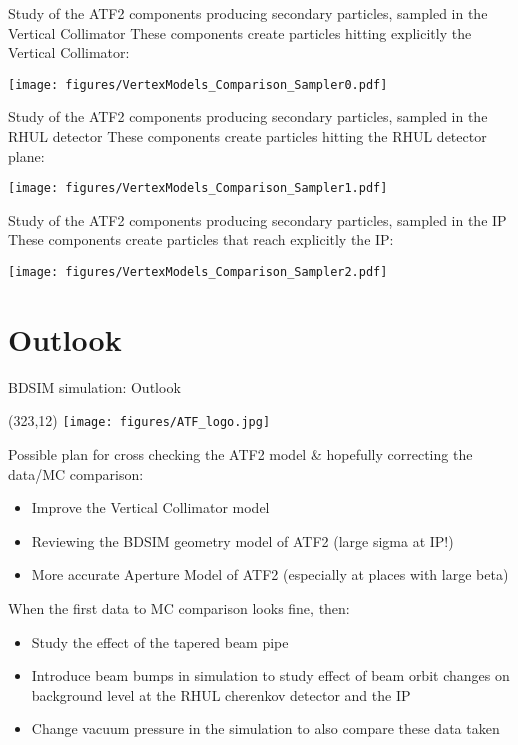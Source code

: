 \documentclass[xcolor={dvipsnames}]{beamer}
\newcommand{\ATFlogo}{
  \setlength{\TPHorizModule}{1pt}
  \setlength{\TPVertModule}{1pt}
  \begin{textblock}{1}(323,12)
   \texttt{[image: figures/ATF\_logo.jpg]}
  \end{textblock}
}
\begin{document}
\begin{frame}{Study of the ATF2 components producing secondary particles, sampled in the Vertical Collimator}
These components create particles hitting explicitly the Vertical Collimator:
 \begin{center}
\texttt{[image: figures/VertexModels\_Comparison\_Sampler0.pdf]}
\end{center}
\end{frame}
\begin{frame}{Study of the ATF2 components producing secondary particles, sampled in the RHUL detector}
These components create particles hitting the RHUL detector plane:
 \begin{center}
\texttt{[image: figures/VertexModels\_Comparison\_Sampler1.pdf]}
\end{center}
\end{frame}
\begin{frame}{Study of the ATF2 components producing secondary particles, sampled in the IP}
These components create particles that reach explicitly the IP:
 \begin{center}
\texttt{[image: figures/VertexModels\_Comparison\_Sampler2.pdf]}
\end{center}
\end{frame}

\section{Outlook}
\begin{frame}{BDSIM simulation: Outlook}
\ATFlogo
Possible plan for cross checking the ATF2 model \& hopefully correcting the data/MC comparison:\\
\begin{itemize}
 \item Improve the Vertical Collimator model
 \item Reviewing the BDSIM geometry model of ATF2 (large sigma at IP!)
 \item More accurate Aperture Model of ATF2 (especially at places with large beta)
\end{itemize}
When the first data to MC comparison looks fine, then:
\begin{itemize}
 \item Study the effect of the tapered beam pipe
 \item Introduce beam bumps in simulation to study effect of beam orbit changes on background level at the RHUL cherenkov detector and the IP
 \item Change vacuum pressure in the simulation to also compare these data taken
\end{itemize}

\end{frame}
\end{document}
